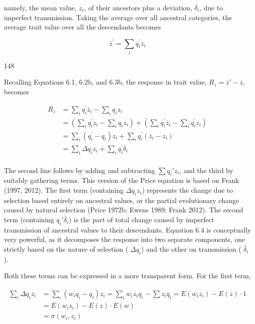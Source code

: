 \documentclass{article}
\begin{document}
namely, the mean value,  $ z_{i} $, of their ancestors plus a deviation,  $ \overline{\delta}_{i} $, due to imperfect transmission. Taking the average over all ancestral categories, the average trait value over all the descendants becomes

\begin{equation}
\overline{z}^{\prime}=\sum_{i}q_{i}^{\prime}\overline{z}_{i}
\tag{6.3b}
\label{eq:6_3b}
\end{equation}

148

Recalling Equations 6.1, 6.2b, and 6.3b, the response in trait value,  $ R_z = \overline{z}' - \overline{z} $, becomes

\begin{equation}
\begin{aligned}R_{z}&=\sum_{i}q_{i}^{\prime}\overline{z}_{i}-\sum_{i}q_{i}z_{i}\\&=\left(\sum_{i}q_{i}^{\prime}z_{i}-\sum_{i}q_{i}z_{i}\right)+\left(\sum_{i}q_{i}^{\prime}\overline{z}_{i}-\sum_{i}q_{i}^{\prime}z_{i}\right)\\&=\sum_{i}\left(q_{i}^{\prime}-q_{i}\right)z_{i}+\sum_{i}q_{i}^{\prime}\left(\overline{z}_{i}-z_{i}\right)\\&=\sum_{i}\Delta q_{i}z_{i}+\sum_{i}q_{i}^{\prime}\overline{\delta}_{i}\\ \end{aligned}
\tag{6.4}
\label{eq:6_4}
\end{equation}

The second line follows by adding and subtracting  $ \sum q_i' z_i $, and the third by suitably gathering terms. This version of the Price equation is based on Frank (1997, 2012). The first term (containing  $ \Delta q_i z_i $) represents the change due to selection based entirely on ancestral values, or the partial evolutionary change caused by natural selection (Price 1972b; Ewens 1989; Frank 2012). The second term (containing  $ q_i' \bar{\delta}_i $) is the part of total change caused by imperfect transmission of ancestral values to their descendants. Equation 6.4 is conceptually very powerful, as it decomposes the response into two separate components, one strictly based on the nature of selection ( $ \Delta q_i $) and the other on transmission ( $ \bar{\delta}_i $).

Both these terms can be expressed in a more transparent form. For the first term,

\begin{equation}
\begin{align*}\sum_{i}\Delta q_{i}z_{i}&=\sum_{i}\left(w_{i}q_{i}-q_{i}\right)z_{i}=\sum_{i}w_{i}z_{i}q_{i}-\sum z_{i}q_{i}=E(w_{i}z_{i})-E(z)\cdot1\\&=E(w_{i}z_{i})-E(z)\cdot E(w)\\&=\sigma(w_{i},z_{i})\end{align*}
\tag{6.5a}
\label{eq:6_5a}
\end{equation}
\end{document}
